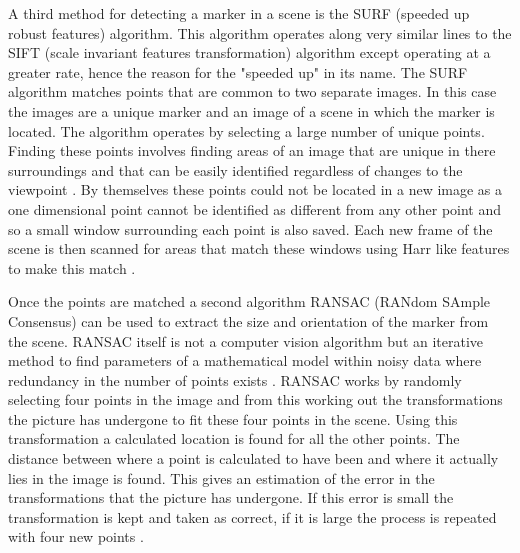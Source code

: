 A third method for detecting a marker in a scene is the SURF (speeded up robust features) algorithm. This algorithm operates along very similar lines to the SIFT (scale invariant features transformation) algorithm except operating at a greater rate, hence the reason for the "speeded up" in its name. The SURF algorithm matches points that are common to two separate images. In this case the images are a unique marker and an image of a scene in which the marker is located. The algorithm operates by selecting a large number of unique points. Finding these points involves finding areas of an image that are unique in there surroundings and that can be easily identified regardless of changes to the viewpoint \cite{surf}. By themselves these points could not be located in a new image as a one dimensional point cannot be identified as different from any other point and so a small window surrounding each point is also saved. Each new frame of the scene is then scanned for areas that match these windows using Harr like features to make this match \cite{haar_like}.

Once the points are matched a second algorithm RANSAC (RANdom SAmple Consensus) can be used to extract the size and orientation of the marker from the scene. RANSAC itself is not a computer vision algorithm but an iterative method to find parameters of a mathematical model within noisy data where redundancy in the number of points exists \cite{cosc428}. RANSAC works by randomly selecting four points in the image and from this working out the transformations the picture has undergone to fit these four points in the scene. Using this transformation a calculated location is found for all the other points. The distance between where a point is calculated to have been and where it actually lies in the image is found. This gives an estimation of the error in the transformations that the picture has undergone. If this error is small the transformation is kept and taken as correct, if it is large the process is repeated with four new points \cite{ransac}.